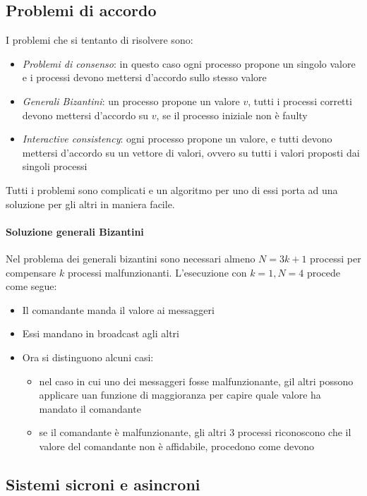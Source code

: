 \subsection{Problemi di accordo}
I problemi che si tentanto di risolvere sono:
\begin{itemize}
    \item \emph{Problemi di consenso}: in questo caso ogni processo 
    propone un singolo valore e i processi devono mettersi d'accordo 
    sullo stesso valore
    \item \emph{Generali Bizantini}: un processo propone un valore $v$, 
    tutti i processi corretti devono mettersi d'accordo su $v$, se 
    il processo iniziale non è faulty
    \item \emph{Interactive consistency}: ogni processo propone un valore, 
    e tutti devono mettersi d'accordo su un vettore di valori, 
    ovvero su tutti i valori proposti dai singoli processi
\end{itemize}

Tutti i problemi sono complicati e un algoritmo per uno di essi 
porta ad una soluzione per gli altri in maniera facile.

\paragraph{Soluzione generali Bizantini}
Nel problema dei generali bizantini sono necessari almeno 
$N = 3k + 1$ processi per compensare $k$ processi malfunzionanti.
L'esecuzione con $k = 1, N = 4$ procede come segue: 
\begin{itemize}
    \item Il comandante manda il valore ai messaggeri
    \item Essi mandano in broadcast agli altri
    \item Ora si distinguono alcuni casi:
    \begin{itemize}
        \item nel caso in cui uno dei messaggeri fosse malfunzionante, 
        gil altri possono applicare uan funzione di maggioranza 
        per capire quale valore ha mandato il comandante
        \item se il comandante è malfunzionante, gli altri 3 processi 
        riconoscono che il valore del comandante non è affidabile, 
        procedono come devono
    \end{itemize}
\end{itemize}

\subsection{Sistemi sicroni e asincroni}

